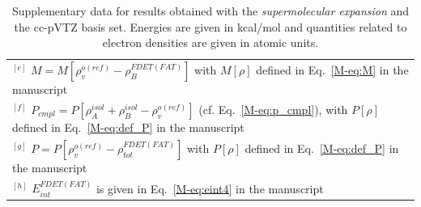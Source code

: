 \documentclass[amsmath,amssymb,preprint,aip,jcp]{revtex4-1}
\begin{document}
\begin{table}[H]
\begin{center}
{\begin{tabular}{|l|l|l|l|l|l|l|l|l|l|}
\multicolumn{10}{p{1.0\textwidth}}{$^{[e]}$ $M=M[\rho_v^{o(ref)} - \rho^{FDET(FAT)}_{B}]$ with $M[\rho]$ defined in Eq.~\ref{M-eq:M} in the manuscript}\\
\multicolumn{10}{p{1.0\textwidth}}{$^{[f]}$ $P_{cmpl}=P[\rho_A^{isol}+\rho_B^{isol} - \rho_v^{o(ref)}]$ (cf. Eq.~\ref{M-eq:p_cmpl}), with $P[\rho]$ defined in Eq.~\ref{M-eq:def_P} in the manuscript}\\
\multicolumn{10}{p{1.0\textwidth}}{$^{[g]}$ $P=P[\rho_v^{o(ref)} - \rho_{tot}^{FDET(FAT)}]$ with $P[\rho]$ defined in Eq.~\ref{M-eq:def_P} in the manuscript}\\
\multicolumn{10}{p{1.0\textwidth}}{$^{[h]}$ $E^{FDET(FAT)}_{int}$ is given in Eq.~\ref{M-eq:eint4} in the manuscript}\\
\end{tabular}
}
\end{center}
\caption{Supplementary data for results obtained with the \textit{supermolecular expansion} and the cc-pVTZ basis set. Energies are given in kcal/mol and quantities related to electron densities are given in atomic units.}
\end{table}
\end{document}
